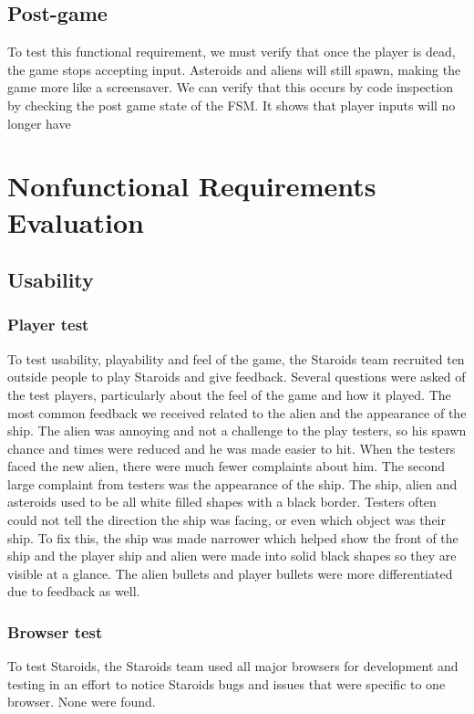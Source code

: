\documentclass[12pt, titlepage]{article}
\begin{document}
\subsection{Post-game}
To test this functional requirement, we must verify that once the player is dead, the game stops accepting input. Asteroids and aliens will still spawn, making the game more like a screensaver. We can verify that this occurs by code inspection by checking the post game state of the FSM. It shows that player inputs will no longer have

\section{Nonfunctional Requirements Evaluation}

\subsection{Usability}

\subsubsection{Player test}
To test usability, playability and feel of the game, the Staroids team recruited ten outside people to play Staroids and give feedback. Several questions were asked of the test players, particularly about the feel of the game and how it played. The most common feedback we received related to the alien and the appearance of the ship. The alien was annoying and not a challenge to the play testers, so his spawn chance and times were reduced and he was made easier to hit. When the testers faced the new alien, there were much fewer complaints about him. The second large complaint from testers was the appearance of the ship. The ship, alien and asteroids used to be all white filled shapes with a black border. Testers often could not tell the direction the ship was facing, or even which object was their ship. To fix this, the ship was made narrower which helped show the front of the ship and the player ship and alien were made into solid black shapes so they are visible at a glance. The alien bullets and player bullets were more differentiated due to feedback as well.\\

\subsubsection{Browser test}
To test Staroids, the Staroids team used all major browsers for development and testing in an effort to notice Staroids bugs and issues that were specific to one browser. None were found.\\
\end{document}

